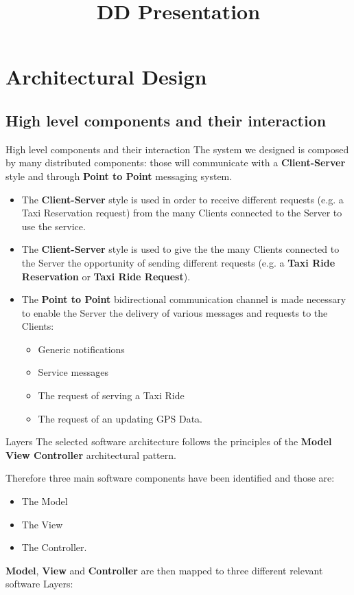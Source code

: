 \documentclass{../common/latex_classes/pdf_presentation}
\title{DD Presentation}
\begin{document}
	\titleToc{}
	\section{Architectural Design}
	
	\subsection{High level components and their interaction}
	
	\begin{frame}{High level components and their interaction}
		The system we designed is composed by many distributed components: those will communicate with a \textbf{Client-Server} style and through \textbf{Point to Point} messaging system. 
		\begin{itemize}
			\item The \textbf{Client-Server} style is used in order to receive different requests (e.g. a Taxi Reservation request) from the many Clients connected to the Server to use the service. 
			
			\item The \textbf{Client-Server} style is used to give the the many Clients connected to the Server the opportunity of sending different requests (e.g. a \textbf{Taxi Ride Reservation} or \textbf{Taxi Ride Request}).
			\item The \textbf{Point to Point} bidirectional communication channel is made necessary to enable the Server the delivery of various messages and requests to the Clients:
			\begin{itemize}
				\item Generic notifications
				\item Service messages
				\item The request of serving a Taxi Ride
				\item The request of an updating GPS Data.
			\end{itemize}
		\end{itemize}
	\end{frame}
	
	\begin{frame}{Layers}
		The selected software architecture follows the principles of the \textbf{Model View Controller} architectural pattern. 
		
		Therefore three main software components have been identified and those are:
		\begin{itemize}
			\item The Model
			\item The View 
			\item The Controller.
		\end{itemize}
		
		\textbf{Model}, \textbf{View} and \textbf{Controller} are then mapped to three different relevant software Layers:
	\end{frame}
	
\end{document}
